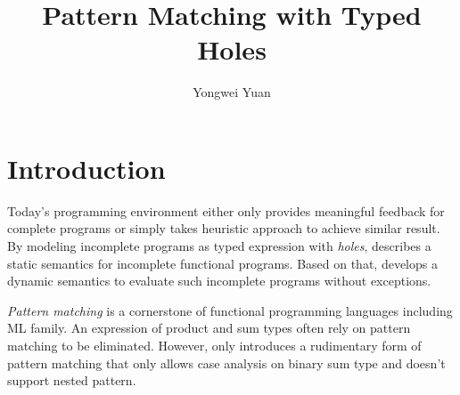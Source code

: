 \documentclass[acmsmall,screen,review,nonacm]{acmart}
\theoremstyle{slplain}
\numberwithin{thm}{section}
\begin{document}
  
\title{Pattern Matching with Typed Holes}

\author{Yongwei Yuan}


\maketitle

\section{Introduction}
\label{sec:intro}
Today's programming environment either only provides meaningful feedback for complete programs or simply takes heuristic approach to achieve similar result.
By modeling incomplete programs as typed expression with \emph{holes}, \citet{DBLP:conf/popl/OmarVHAH17} describes a static semantics for incomplete functional programs. Based on that, \citet{DBLP:journals/pacmpl/OmarVCH19} develops a dynamic semantics to evaluate such incomplete programs without exceptions.

\emph{Pattern matching} is a cornerstone of functional programming languages including ML family. An expression of product and sum types often rely on pattern matching to be eliminated.
However, \citet{DBLP:journals/pacmpl/OmarVCH19} only introduces a rudimentary form of pattern matching that only allows case analysis on binary sum type and doesn't support nested pattern.
\end{document}
